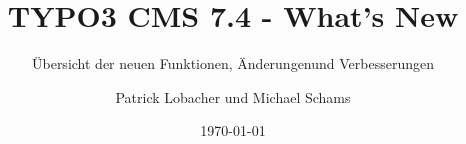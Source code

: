 %

%
%

\documentclass[t]{beamer}

\beamertemplatenavigationsymbolsempty

{
	\usetheme{typo3slides}
}

\title{TYPO3 CMS 7.4 - What's New}
\subtitle{Übersicht der neuen Funktionen, Änderungen\newline und Verbesserungen}
\author{
	\centerline{Patrick Lobacher und Michael Schams}
}

\date{\today}



\sharefont


\begingroup
	[default]
	\begin{frame}
		\titlepage
	\end{frame}
\endgroup


\section*{TYPO3 CMS 7.4 - What's New}
\begin{frame}[fragile]
	\frametitle{Kapitelübersicht}
	\framesubtitle{Kapitelübersicht}

	\tableofcontents

\end{frame}

